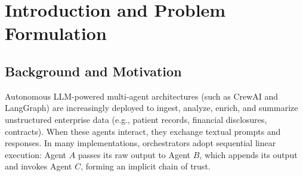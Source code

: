 \documentclass[10pt,a4paper]{article}
\begin{document}
\begin{abstract}
\noindent
In modern multi-agent systems (MAS) operating on unstructured private documents, chaining LLM agents linearly poses severe security, privacy, and non-determinism vulnerabilities. This report provides an in-depth comparative analysis of the transformation from a traditional linear execution pipeline (\texttt{Process.sequential}) to a centralized, Zero-Trust supervised architecture (\texttt{Process.hierarchical}) within CrewAI. In the baseline sequential implementation, context is accumulated progressively across five worker agents without centralized oversight, exposing the pipeline to cascade prompt injections, uncontrolled delegation loops, and unverifiable execution traces. In our redesigned hierarchical model, an independent \texttt{PrivacySupervisorAgent} acts as an authoritarian gatekeeper enforcing absolute zero-trust invariants: strict delegation prevention (\texttt{allow\_delegation=False}), isolated and explicit context passing, intermediate SHA-256 cryptographic state fingerprinting, and dual-payload parsing (\texttt{AUDIT\_TRAIL:} and \texttt{FINAL\_ANSWER:}). We evaluate both paradigms theoretically and empirically across reproducibility, auditability, security blast-radius containment, and computational overhead, backed by a 32-test automated verification suite.
\end{abstract}

\vspace{0.5cm}
\tableofcontents
\newpage

\section{Introduction and Problem Formulation}

\subsection{Background and Motivation}
Autonomous LLM-powered multi-agent architectures (such as CrewAI and LangGraph) are increasingly deployed to ingest, analyze, enrich, and summarize unstructured enterprise data (e.g., patient records, financial disclosures, contracts). When these agents interact, they exchange textual prompts and responses. In many implementations, orchestrators adopt sequential linear execution: Agent $A$ passes its raw output to Agent $B$, which appends its output and invokes Agent $C$, forming an implicit chain of trust.
\end{document}
